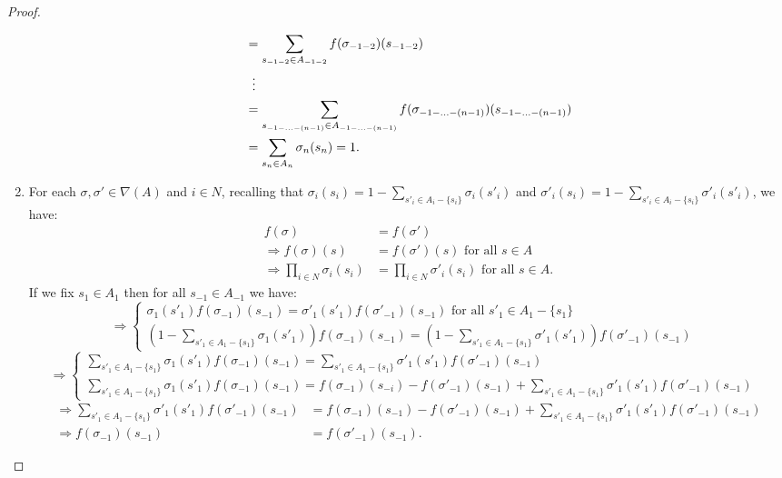 \begin{proposition}
\begin{proof}
\begin{enumerate}
\begin{align*}
					&= \sum_{s_{-1-2} \in A_{-1-2}} f(\sigma_{-1-2})(s_{-1-2}) \\
					&\hspace{2mm} \vdots \\
					&= \sum_{s_{-1 - \ldots - (n-1)} \in A_{-1 - \ldots - (n-1)}} f(\sigma_{-1 - \ldots - (n-1)})(s_{-1 - \ldots - (n-1)}) \\
					&= \sum_{s_n \in A_n} \sigma_n(s_n) = 1.
				\end{align*}
				\item For each $\sigma, \sigma' \in \nabla(A)$ and $i \in N$, recalling that $\sigma_i(s_i) = 1 - \sum_{s'_i \in A_i-\{s_i\}}\sigma_i(s'_i)$ and $\sigma'_i(s_i) = 1 - \sum_{s'_i \in A_i-\{s_i\}}\sigma'_i(s'_i)$, we have:
				\begin{align*}
					f(\sigma) &= f(\sigma') \\
					\Rightarrow f(\sigma)(s) &= f(\sigma')(s) \text{ for all } s \in A \\
					\Rightarrow \prod_{i \in N}\sigma_i(s_i) &= \prod_{i \in N}\sigma'_i(s_i) \text{ for all } s \in A.
				\end{align*}
				If we fix $s_1 \in A_1$ then for all $s_{-1} \in A_{-1}$ we have:
				\[ \Rightarrow
				\begin{cases}
					\displaystyle\sigma_1(s'_1)f(\sigma_{-1})(s_{-1}) = \sigma'_1(s'_1)f(\sigma'_{-1})(s_{-1}) \text{ for all } s'_1 \in A_1-\{s_1\}& \\
					\displaystyle\left(1- \sum_{s'_1 \in A_1-\{s_1\}}\sigma_1(s'_1)\right)f(\sigma_{-1})(s_{-1}) = \left(1- \sum_{s'_1 \in A_1-\{s_1\}}\sigma'_1(s'_1)\right)f(\sigma'_{-1})(s_{-1})&
				\end{cases}
				\]
				\[ \Rightarrow
				\begin{cases} 
					\displaystyle\sum_{s'_1 \in A_1-\{s_1\}}\sigma_1(s'_1)f(\sigma_{-1})(s_{-1}) = \sum_{s'_1 \in A_1-\{s_1\}}\sigma'_1(s'_1)f(\sigma'_{-1})(s_{-1})& \\
					\displaystyle\sum_{s'_1 \in A_1-\{s_1\}}\sigma_1(s'_1)f(\sigma_{-1})(s_{-1}) = f(\sigma_{-1})(s_{-i}) - f(\sigma'_{-1})(s_{-1}) + \sum_{s'_1 \in A_1-\{s_1\}}\sigma'_1(s'_1)f(\sigma'_{-1})(s_{-1})&
				\end{cases}
				\]
				\begin{align*}
					\Rightarrow \sum_{s'_1 \in A_1-\{s_1\}}\sigma'_1(s'_1)f(\sigma'_{-1})(s_{-1}) &= f(\sigma_{-1})(s_{-1}) - f(\sigma'_{-1})(s_{-1}) + \sum_{s'_1 \in A_1-\{s_1\}}\sigma'_1(s'_1)f(\sigma'_{-1})(s_{-1}) \\
					\Rightarrow f(\sigma_{-1})(s_{-1}) &= f(\sigma'_{-1})(s_{-1}).

\end{align*}
\end{enumerate}
\end{proof}
\end{proposition}
